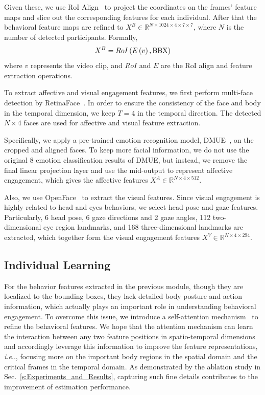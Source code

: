 \documentclass[VANCOUVER,STIX1COL]{WileyNJD-v2}
\makeatletter
\DeclareRobustCommand\onedot{\futurelet\@let@token\@onedot}
\def\@onedot{\ifx\@let@token.\else.\null\fi\xspace}
\def\ie{\emph{i.e}\onedot}
\makeatother
\begin{document}
Given these, we use RoI Align~\cite{He2017Mask} to project the coordinates on the frames' feature maps and slice out the corresponding features for each individual. After that the behavioral feature maps are refined to $X^B \in \mathbb{R}^{N\times1024\times4\times7\times7}$, where $N$ is the number of detected participants. Formally,
\begin{equation}
  X^B = RoI\left(E\left(v\right), {\rm BBX}\right)
\end{equation}
where $v$ represents the video clip, and $RoI$ and $E$ are the RoI align and feature extraction operations.

To extract affective and visual engagement features, we first perform multi-face detection by RetinaFace~\cite{Deng2020RetinaFace}. In order to ensure the consistency of the face and body in the temporal dimension, we keep $T = 4$ in the temporal direction. The detected $N\times4$ faces are used for affective and visual feature extraction.

Specifically, we apply a pre-trained emotion recognition model, DMUE~\cite{She2021Dive}, on the cropped and aligned faces. To keep more facial information, we do not use the original 8 emotion classification results of DMUE, but instead, we remove the final linear projection layer and use the mid-output to represent affective engagement, which gives the affective features $X^A \in \mathbb{R}^{N\times4\times512}$.

Also, we use OpenFace~\cite{Baltrusaitis2018OpenFace} to extract the visual features. Since visual engagement is highly related to head and eyes behaviors, we select head pose and gaze features. Particularly, 6 head pose, 6 gaze directions and 2 gaze angles, 112 two-dimensional eye region landmarks, and 168 three-dimensional landmarks are extracted, which together form the visual engagement features $X^V \in \mathbb{R}^{N\times4\times294}$.

\subsection{Individual Learning}
\label{subs:Individual_Learning}

For the behavior features extracted in the previous module, though they are localized to the bounding boxes, they lack detailed body posture and action information, which actually plays an important role in understanding behavioral engagement. To overcome this issue, we introduce a self-attention mechanism~\cite{Wang2018NonLocal} to refine the behavioral features. We hope that the attention mechanism can learn the interaction between any two feature positions in spatio-temporal dimensions and accordingly leverage this information to improve the feature representations, \ie, focusing more on the important body regions in the spatial domain and the critical frames in the temporal domain. As demonstrated by the ablation study in Sec.~\ref{s:Experiments_and_Results}, capturing such fine details contributes to the improvement of estimation performance.
\end{document}
